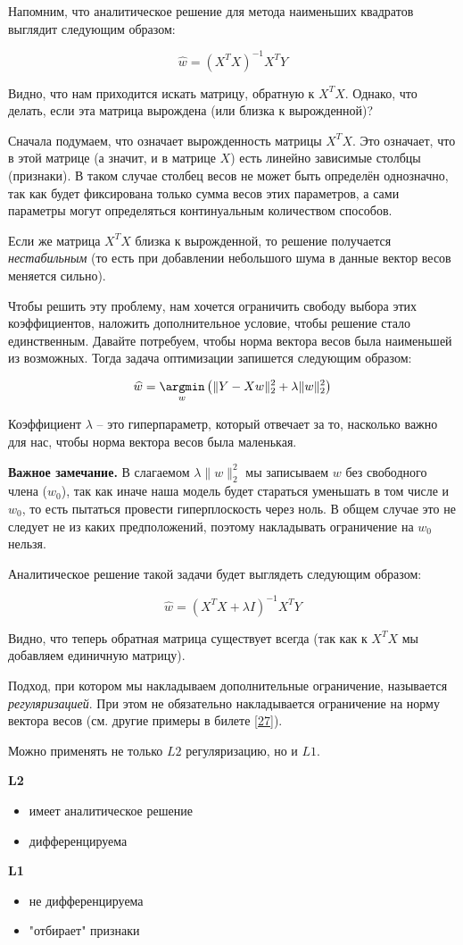 Напомним, что аналитическое решение для метода наименьших квадратов выглядит следующим образом:

\[
\widehat{w} = (X^T X)^{-1} X^T Y
\]

Видно, что нам приходится искать матрицу, обратную к $X^T X$. Однако, что делать, если эта матрица вырождена (или близка к вырожденной)? 

Сначала подумаем, что означает вырожденность матрицы $X^T X$. Это означает, что в этой матрице (а значит, и в матрице $X$) есть линейно зависимые столбцы (признаки). В таком случае столбец весов не может быть определён однозначно, так как будет фиксирована только сумма весов этих параметров, а сами параметры могут определяться континуальным количеством способов.

Если же матрица $X^T X$ близка к вырожденной, то решение получается \textit{нестабильным} (то есть при добавлении небольшого шума в данные вектор весов меняется сильно).

Чтобы решить эту проблему, нам хочется ограничить свободу выбора этих коэффициентов, наложить дополнительное условие, чтобы решение стало единственным. Давайте потребуем, чтобы норма вектора весов была наименьшей из возможных. Тогда задача оптимизации запишется следующим образом:

\[
\widehat{w} = \underset{w}{\argmin}
\left( \|Y - Xw\|_2^2 + \lambda \|w\|_2^2 \right)
\]

Коэффициент $\lambda$ -- это гиперпараметр, который отвечает за то, насколько важно для нас, чтобы норма вектора весов была маленькая.

\textbf{Важное замечание.}
В слагаемом \(\lambda \|w\|_2^2\) мы записываем $w$ без свободного члена ($w_0$), так как иначе наша модель будет стараться уменьшать в том числе и $w_0$, то есть пытаться провести гиперплоскость через ноль. В общем случае это не следует не из каких предположений, поэтому накладывать ограничение на $w_0$ нельзя.

Аналитическое решение такой задачи будет выглядеть следующим образом:

\[
\widehat{w} = \left( X^T X + \lambda I \right)^{-1} X^T Y
\]

Видно, что теперь обратная матрица существует всегда (так как  к $X^T X$ мы добавляем единичную матрицу).

Подход, при котором мы накладываем дополнительные ограничение, называется \textit{регуляризацией}. При этом не обязательно накладывается ограничение на норму вектора весов (см. другие примеры в билете \ref{27}).

Можно применять не только $L2$ регуляризацию, но и $L1$.

\textbf{L2}
\begin{itemize}
    \item имеет аналитическое решение
    \item дифференцируема
\end{itemize}

\textbf{L1}
\begin{itemize}
    \item не дифференцируема
    \item "отбирает" признаки
\end{itemize}